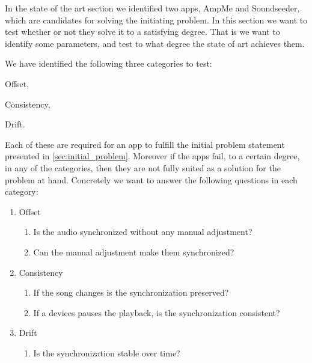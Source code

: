 In the state of the art section we identified two apps, AmpMe and Soundseeder, which are candidates for solving the initiating problem. 
In this section we want to test whether or not they solve it to a satisfying degree. 
That is we want to identify some parameters, and test to what degree the state of art achieves them.

We have identified the following three categories to test:
\begin{enumerate*}[label=(\alph*)]
    \item Offset,
    \item Consistency,
    \item Drift.
\end{enumerate*}

Each of these are required for an app to fulfill the initial problem statement presented in \vref{sec:initial_problem}.
Moreover if the apps fail, to a certain degree, in any of the categories, then they are not fully suited as a solution for the problem at hand. 
Concretely we want to answer the following questions in each category:
\begin{enumerate}[label=(\alph*)]
    \item Offset
    \begin{enumerate}[label=(\arabic*)]
        \item Is the audio synchronized without any manual adjustment?
        \item Can the manual adjustment make them synchronized?
    \end{enumerate} 
    \item Consistency
    \begin{enumerate}[start=3,label=(\arabic*)]
        \item If the song changes is the synchronization preserved?
        \item If a devices pauses the playback, is the synchronization consistent?
    \end{enumerate}
    \item Drift
    \begin{enumerate}[start=6,label=(\arabic*)]
        \item Is the synchronization stable over time?
    \end{enumerate}
\end{enumerate}
